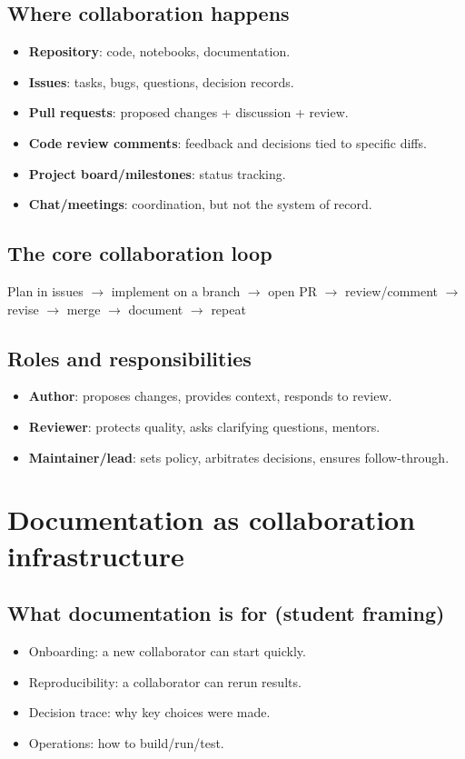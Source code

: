 \subsection{Where collaboration happens}
\begin{itemize}
\item \textbf{Repository}: code, notebooks, documentation.
\item \textbf{Issues}: tasks, bugs, questions, decision records.
\item \textbf{Pull requests}: proposed changes + discussion + review.
\item \textbf{Code review comments}: feedback and decisions tied to specific diffs.
\item \textbf{Project board/milestones}: status tracking.
\item \textbf{Chat/meetings}: coordination, but not the system of record.
\end{itemize}

\subsection{The core collaboration loop}
\begin{center}
Plan in issues $\rightarrow$ implement on a branch $\rightarrow$ open PR $\rightarrow$ review/comment $\rightarrow$ revise $\rightarrow$ merge $\rightarrow$ document $\rightarrow$ repeat
\end{center}

\subsection{Roles and responsibilities}
\begin{itemize}
\item \textbf{Author}: proposes changes, provides context, responds to review.
\item \textbf{Reviewer}: protects quality, asks clarifying questions, mentors.
\item \textbf{Maintainer/lead}: sets policy, arbitrates decisions, ensures follow-through.
\end{itemize}

\section{Documentation as collaboration infrastructure}
\subsection{What documentation is for (student framing)}
\begin{itemize}
\item Onboarding: a new collaborator can start quickly.
\item Reproducibility: a collaborator can rerun results.
\item Decision trace: why key choices were made.
\item Operations: how to build/run/test.
\end{itemize}

